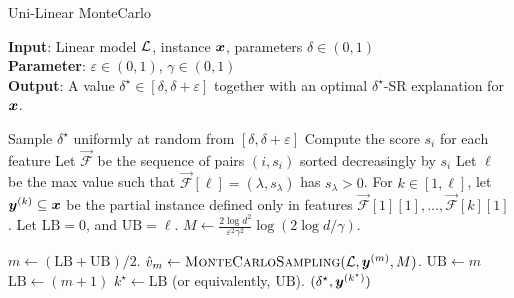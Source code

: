 \renewcommand{\algorithmiccomment}[1]{\; \; \texttt{/* #1 */}}
\begin{algorithm}[tb]
	\caption{Uni-Linear MonteCarlo}
	\label{alg:algorithm}
	\textbf{Input}: Linear model $\mathcal{L}$, instance ${\bm{x}}$, parameters $\delta \in (0, 1)$\\
	\textbf{Parameter}:  $\varepsilon \in (0, 1)$,  $\gamma \in (0, 1)$\\
	\textbf{Output}: A value $\delta^\star \in [\delta, \delta+\varepsilon]$ together with an optimal $\delta^\star$-SR explanation for ${\bm{x}}$.
	\begin{algorithmic}[1] %
	\STATE Sample $\delta^\star$ uniformly at random from $[\delta, \delta + \varepsilon]$
	\STATE Compute the score $s_i$ for each feature
	\STATE Let $\vec{\mathcal{F}}$ be the sequence of pairs $(i, s_i)$ sorted decreasingly by $s_i$
	\STATE Let $\ell$ be the max value such that $\vec{\mathcal{F}}[\ell] = (\lambda, s_\lambda)$ has $s_\lambda > 0$.
	\STATE For $k \in [1, \ell]$, let ${\bm{y}}^{(k)} \subseteq {\bm{x}}$ be the partial instance defined only in features $\vec{\mathcal{F}}[1][1], \ldots, \vec{\mathcal{F}}[k][1]$.
	\STATE Let $\textrm{LB} = 0$, and $\textrm{UB} = \ell$.
	\STATE $M \gets \frac{2\log d^2}{\varepsilon^2 \gamma^2} \log(2 \log d / \gamma)$.

		\STATE $m \gets \left(\textrm{LB} + \textrm{UB} \right)/2$.
		\STATE $\hat{v}_m \gets \textsc{MonteCarloSampling}(\mathcal{L}, {\bm{y}}^{(m)}, M)$.
			\STATE $\textrm{UB} \gets m$
		\ELSE
			\STATE $\textrm{LB} \gets (m+1)$
		\ENDIF
	\ENDWHILE
	\STATE $k^\star \gets \textrm{LB}$ (or equivalently, $\textrm{UB}$).
	\STATE \RETURN $(\delta^\star, {\bm{y}}^{(k^\star)})$
	\end{algorithmic}
	\end{algorithm}

